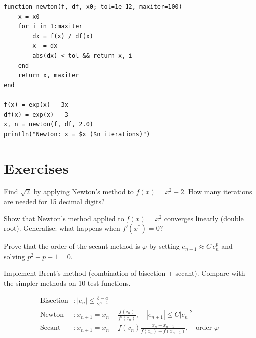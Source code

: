 \begin{codeblock}[title=\textbf{Julia}]
\begin{verbatim}
function newton(f, df, x0; tol=1e-12, maxiter=100)
    x = x0
    for i in 1:maxiter
        dx = f(x) / df(x)
        x -= dx
        abs(dx) < tol && return x, i
    end
    return x, maxiter
end

f(x) = exp(x) - 3x
df(x) = exp(x) - 3
x, n = newton(f, df, 2.0)
println("Newton: x = $x ($n iterations)")
\end{verbatim}
\end{codeblock}

\section{Exercises}

\begin{exercise}[$\star$]
Find $\sqrt{2}$ by applying Newton's method to $f(x)=x^2-2$. How many iterations are needed for 15 decimal digits?
\end{exercise}

\begin{exercise}[$\star\star$]
Show that Newton's method applied to $f(x)=x^2$ converges linearly (double root). Generalise: what happens when $f'(x^*)=0$?
\end{exercise}

\begin{exercise}[$\star\star$]
Prove that the order of the secant method is $\varphi$ by setting $e_{n+1}\approx C\,e_n^p$ and solving $p^2-p-1=0$.
\end{exercise}

\begin{exercise}
Implement Brent's method (combination of bisection + secant). Compare with the simpler methods on 10 test functions.
\end{exercise}

\begin{keyformulas}
\begin{align*}
\text{Bisection} &: |e_n|\leq\frac{b-a}{2^{n+1}} \\
\text{Newton} &: x_{n+1}=x_n-\frac{f(x_n)}{f'(x_n)},\quad |e_{n+1}|\leq C|e_n|^2 \\
\text{Secant} &: x_{n+1}=x_n-f(x_n)\frac{x_n-x_{n-1}}{f(x_n)-f(x_{n-1})},\quad \text{order }\varphi
\end{align*}
\end{keyformulas}

